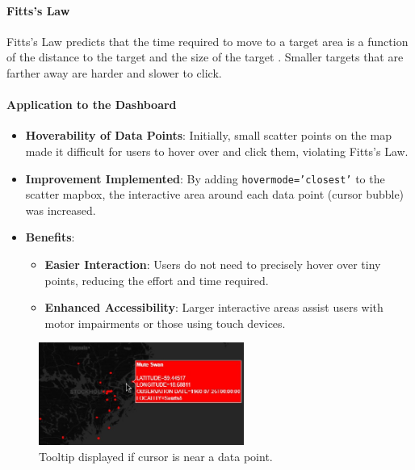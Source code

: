\paragraph{Fitts's Law}

Fitts's Law predicts that the time required to move to a target area is a function of the distance to the target and the size of the target \cite{mccrocklinInteractionDesignData2015}. Smaller targets that are farther away are harder and slower to click.

\paragraph{Application to the Dashboard}

\begin{itemize}
    \item \textbf{Hoverability of Data Points}: Initially, small scatter points on the map made it difficult for users to hover over and click them, violating Fitts's Law. 
    \item \textbf{Improvement Implemented}: By adding \texttt{hovermode='closest'} to the scatter mapbox, the interactive area around each data point (cursor bubble) was increased. 
    \item \textbf{Benefits}: 
    \begin{itemize} 
        \item \textbf{Easier Interaction}: Users do not need to precisely hover over tiny points, reducing the effort and time required. 
        \item \textbf{Enhanced Accessibility}: Larger interactive areas assist users with motor impairments or those using touch devices. 
    \end{itemize} 
\end{itemize}

\begin{figure}[H] 
    \centering 
    \includegraphics[width=0.6\textwidth]{figures/cursor_bubbles.jpg} 
    \caption{Tooltip displayed if cursor is near a data point.} 
    \label{fig:cursor_bubbles} 
\end{figure}

